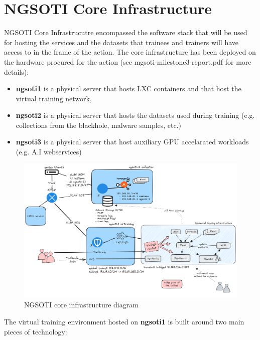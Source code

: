 \chapter{NGSOTI Core Infrastructure}

NGSOTI Core Infrastrucutre encompassed the software stack that will be used for hosting the services and the datasets that trainees and trainers will have access to in the frame of the action. The core infrastructure has been deployed on the hardware procured for the action (see mgsoti-milestone3-report.pdf for more details):

\begin{itemize}
	\item {\bf{ngsoti1}} is a physical server that hosts LXC containers and that host the virtual training network,
	\item {\bf{ngsoti2}} is a physical server that hosts the datasets used during training (e.g. collections from the blackhole, malware samples, etc.)
	\item {\bf{ngsoti3}} is a physical server that host auxiliary GPU accelarated workloads (e.g. A.I webservices)
\end{itemize}



\begin{figure}[ht]
	\centering
	\includegraphics[width=\textwidth]{./img/NGSOTI-architecture.png}
	\caption{NGSOTI core infrastructure diagram}
	\label{fig1}
	\end{figure}

The virtual training environment hosted on {\bf{ngsoti1}} is built around two main pieces of technology:

